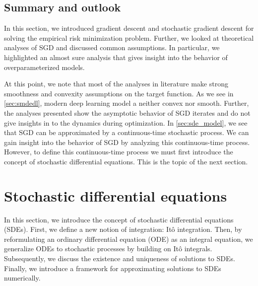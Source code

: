 \documentclass[12pt]{article}
\theoremstyle{definition}
\numberwithin{equation}{section}
\begin{document}
\subsection{Summary and outlook}
In this section, we introduced gradient descent and stochastic gradient descent for solving the empirical risk minimization problem. Further, we looked at theoretical analyses of SGD and discussed common assumptions. In particular, we highlighted an almost sure analysis that gives insight into the behavior of overparameterized models. 

At this point, we note that most of the analyses in literature make strong smoothness and convexity assumptions on the target function. As we see in \autoref{sec:smdedl}, modern deep learning model a neither convex nor smooth. Further, the analyses presented show the asymptotic behavior of SGD iterates and do not give insights in to the dynamics during optimization. 
In \autoref{sec:sde_model}, we see that SGD can be approximated by a continuous-time stochastic process. We can gain insight into the behavior of SGD by analyzing this continuous-time process. However, to define this continuous-time process we must first introduce the concept of stochastic differential equations. This is the topic of the next section.


\section{Stochastic differential equations}
\label{sec:BackgroundSDETheory}
In this section, we introduce the concept of stochastic differential equations (SDEs). First, we define a new notion of integration: Itô integration. Then, by reformulating an ordinary differential equation (ODE) as an integral equation, we generalize ODEs to stochastic processes by building on Itô integrals. Subsequently, we discuss the existence and uniqueness of solutions to SDEs. Finally, we introduce a framework for approximating solutions to SDEs numerically.
\end{document}
